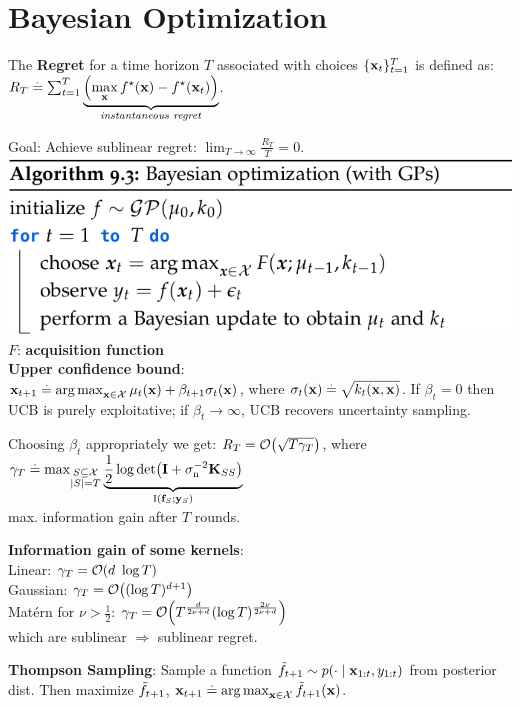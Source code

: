 \section{Bayesian Optimization}
\begin{framed}
    The \textbf{Regret} for a time horizon $T$ associated with choices $\{\mathbf{x}_t\}_{t=1}^T$ is defined as: $R_T \overset{.}{=} \sum_{t=1}^T \underbrace{\left({\max_{\mathbf{x}} f^\star(\mathbf{x}) - f^\star(\mathbf{x}_t)}\right)}_{\text{\textit{instantaneous regret}}}$.
\end{framed}
Goal: Achieve sublinear regret: $\lim_{T\to\infty} \frac{R_T}{T} = 0$.
\includegraphics[width=0.98\linewidth]{images/Bayesian_Optimization.png}
$F$: \textbf{acquisition function} \\
\textbf{Upper confidence bound}: \\$\mathbf{x}_{t+1} \overset{.}{=} \operatorname*{arg\,max}_{\mathbf{x} \in \mathcal{X}} \mu_{t}(\mathbf{x}) + \beta_{t+1} \sigma_{t}(\mathbf{x})$, where $\sigma_t(\mathbf{x}) \overset{.}{=} \sqrt{k_t(\mathbf{x}, \mathbf{x})}$. If $\beta_t = 0$ then UCB is purely exploitative; if $\beta_t \to \infty$, UCB recovers uncertainty sampling.
\begin{framed}
    Choosing $\beta_t$ appropriately we get: $R_T = \BigO{\sqrt{T \gamma_T}}$, where \\
    $\gamma_T \defeq \max_{\substack{\sS \subseteq \spX \\ |\sS| = T}} \underbrace{\frac{1}{2} \log\det{\mI + \sigman^{-2} \mK_{\sS\sS}}}_{\I{\vf_\sS}{\vy_\sS}}$ \\
    max. information gain after $T$ rounds.
\end{framed}
\begin{framed}
    \textbf{Information gain of some kernels}: \\
    Linear: $\gamma_T = \BigO{d ~\log T}$ \\
    Gaussian: $\gamma_T = \BigO{(\log T)^{d+1}}$ \\
    Matérn for $\nu > \frac{1}{2}$: $\gamma_T = \BigO{T^{\frac{d}{2\nu + d}} (\log T)^{\frac{2\nu}{2\nu + d}}}$ \\
    which are sublinear $\Rightarrow$ sublinear regret.
\end{framed}
\textbf{Thompson Sampling}: Sample a function $\Tilde{f}_{t+1} \sim p(\cdot \mid \mathbf{x}_{1:t}, y_{1:t})$ from posterior dist.
Then maximize $\Tilde{f}_{t+1}$, $\mathbf{x}_{t+1} \overset{.}{=} \operatorname*{arg\,max}_{\mathbf{x} \in \mathcal{X}} \Tilde{f}_{t+1}(\mathbf{x})$.
